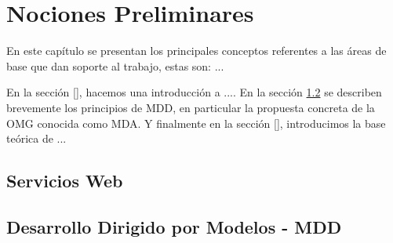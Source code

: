 \chapter{Nociones Preliminares}
\label{Nociones Preliminares}

En este capítulo se presentan los principales conceptos referentes a las áreas de base que dan soporte al trabajo, estas son: ...

En la sección \ref{}, hacemos una introducción a ....
En la sección \ref{Desarrollo Dirigido por Modelos} se describen brevemente los principios de MDD, en particular la propuesta concreta de la OMG conocida como MDA.
Y finalmente en la sección \ref{}, introducimos la base teórica de ...


\section{Servicios Web}
\label{Servicios Web}



\section{Desarrollo Dirigido por Modelos - MDD}
\label{Desarrollo Dirigido por Modelos}






